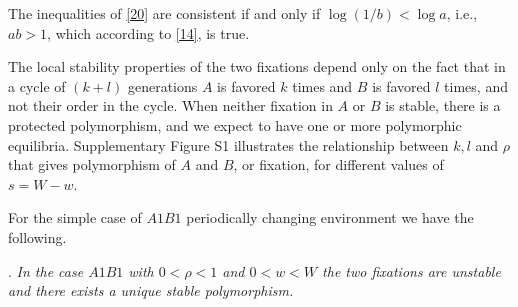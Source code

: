 \documentclass[9pt,twocolumn,twoside,lineno]{pnas-new}
\begin{document}
The inequalities of \eqref{20} are consistent if and only if $\log(1/b)<\log a$, i.e., $ab>1$, which according to \eqref{14}, is true.

The local stability properties of the two fixations depend only on the fact that in a cycle of $(k+l)$ generations $A$ is favored $k$ times and $B$ is favored $l$ times, and not their order in the cycle. 
When neither fixation in $A$ or $B$ is stable, there is a protected polymorphism, and we expect to have one or more polymorphic equilibria. Supplementary Figure S1 illustrates the relationship between $k,l$ and $\rho$ that gives polymorphism of $A$ and $B$, or fixation, for different values of $s=W-w$. 

For the simple case of $A1B1$ periodically changing environment we have the following.
\medskip

. {\sl In the case $A1B1$ with $0<\rho<1$ and $0<w<W$ the two fixations are unstable and there exists a unique stable polymorphism.}\par
\medskip
\end{document}
